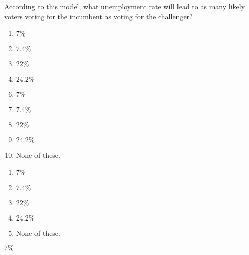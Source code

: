  
According to this model, what unemployment rate will lead to as many likely voters voting for the incumbent as voting for the challenger?


\ifsat
	\begin{enumerate}[label=\Alph*)]
		\item $7\% $ %
		\item $7.4\% $ 
		\item $22\% $ 
		\item $24.2\% $
	\end{enumerate}
\else
\fi

\ifacteven
	\begin{enumerate}[label=\textbf{\Alph*.},itemsep=\fill,align=left]
		\setcounter{enumii}{5}
		\item $7\% $ %
		\item $7.4\% $ 
		\item $22\% $ 
		\addtocounter{enumii}{1}
		\item $24.2\% $
		\item None of these. 
	\end{enumerate}
\else
\fi

\ifactodd
	\begin{enumerate}[label=\textbf{\Alph*.},itemsep=\fill,align=left]
		\item $7\% $ %
		\item $7.4\% $ 
		\item $22\% $ 
		\item $24.2\% $
		\item None of these. 
	\end{enumerate}
\else
\fi

\ifgridin
 $7\% $ %
		
\else
\fi

